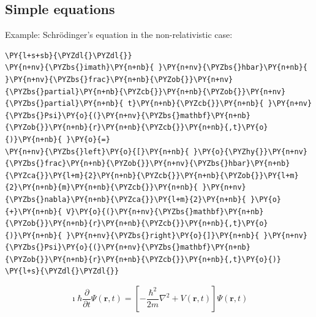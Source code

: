 \documentclass[a4paper,twoside]{article}
\begin{document}
\subsection{Simple equations}
Example: Schrödinger's equation in the non-relativistic case:
\begin{tscode}[lang=latex, engine=pygments]
\begin{Verbatim}[commandchars=\\\{\},breaklines, breakanywhere, commandchars=\\\{\}]
\PY{l+s+sb}{\PYZdl{}\PYZdl{}}
\PY{n+nv}{\PYZbs{}imath}\PY{n+nb}{ }\PY{n+nv}{\PYZbs{}hbar}\PY{n+nb}{ }\PY{n+nv}{\PYZbs{}frac}\PY{n+nb}{\PYZob{}}\PY{n+nv}{\PYZbs{}partial}\PY{n+nb}{\PYZcb{}}\PY{n+nb}{\PYZob{}}\PY{n+nv}{\PYZbs{}partial}\PY{n+nb}{ t}\PY{n+nb}{\PYZcb{}}\PY{n+nb}{ }\PY{n+nv}{\PYZbs{}Psi}\PY{o}{(}\PY{n+nv}{\PYZbs{}mathbf}\PY{n+nb}{\PYZob{}}\PY{n+nb}{r}\PY{n+nb}{\PYZcb{}}\PY{n+nb}{,t}\PY{o}{)}\PY{n+nb}{ }\PY{o}{=}
\PY{n+nv}{\PYZbs{}left}\PY{o}{[}\PY{n+nb}{ }\PY{o}{\PYZhy{}}\PY{n+nv}{\PYZbs{}frac}\PY{n+nb}{\PYZob{}}\PY{n+nv}{\PYZbs{}hbar}\PY{n+nb}{\PYZca{}}\PY{l+m}{2}\PY{n+nb}{\PYZcb{}}\PY{n+nb}{\PYZob{}}\PY{l+m}{2}\PY{n+nb}{m}\PY{n+nb}{\PYZcb{}}\PY{n+nb}{ }\PY{n+nv}{\PYZbs{}nabla}\PY{n+nb}{\PYZca{}}\PY{l+m}{2}\PY{n+nb}{ }\PY{o}{+}\PY{n+nb}{ V}\PY{o}{(}\PY{n+nv}{\PYZbs{}mathbf}\PY{n+nb}{\PYZob{}}\PY{n+nb}{r}\PY{n+nb}{\PYZcb{}}\PY{n+nb}{,t}\PY{o}{)}\PY{n+nb}{ }\PY{n+nv}{\PYZbs{}right}\PY{o}{]}\PY{n+nb}{ }\PY{n+nv}{\PYZbs{}Psi}\PY{o}{(}\PY{n+nv}{\PYZbs{}mathbf}\PY{n+nb}{\PYZob{}}\PY{n+nb}{r}\PY{n+nb}{\PYZcb{}}\PY{n+nb}{,t}\PY{o}{)}
\PY{l+s}{\PYZdl{}\PYZdl{}}
\end{Verbatim}
\end{tscode}
$$
\imath \hbar \frac{\partial}{\partial t} \Psi(\mathbf{r},t) =
\left[ -\frac{\hbar^2}{2m} \nabla^2 + V(\mathbf{r},t) \right] \Psi(\mathbf{r},t)
$$
\end{document}
